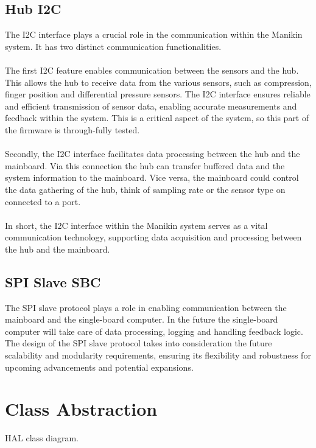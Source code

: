 \subsection{Hub I2C}
The I2C interface plays a crucial role in the communication within the Manikin system. It has two distinct communication functionalities. \\\\
The first I2C feature enables communication between the sensors and the hub. This allows the hub to receive data from the various sensors, such as compression, finger position and differential pressure sensors. The I2C interface ensures reliable and efficient transmission of sensor data, enabling accurate measurements and feedback within the system. This is a critical aspect of the system, so this part of the firmware is through-fully tested. \\\\ 
Secondly, the I2C interface facilitates data processing between the hub and the mainboard. Via this connection the hub can transfer buffered data and the system information to the mainboard. Vice versa, the mainboard could control the data gathering of the hub, think of sampling rate or the sensor type on connected to a port. \\\\
In short, the I2C interface within the Manikin system serves as a vital communication technology, supporting data acquisition and processing between the hub and the mainboard.

\subsection{SPI Slave SBC}
The SPI slave protocol plays a role in enabling communication between the mainboard and the single-board computer. In the future the single-board computer will take care of data processing, logging and handling feedback logic. \\
The design of the SPI slave protocol takes into consideration the future scalability and modularity requirements, ensuring its flexibility and robustness for upcoming advancements and potential expansions. 
\section{Class Abstraction}
HAL class diagram.
